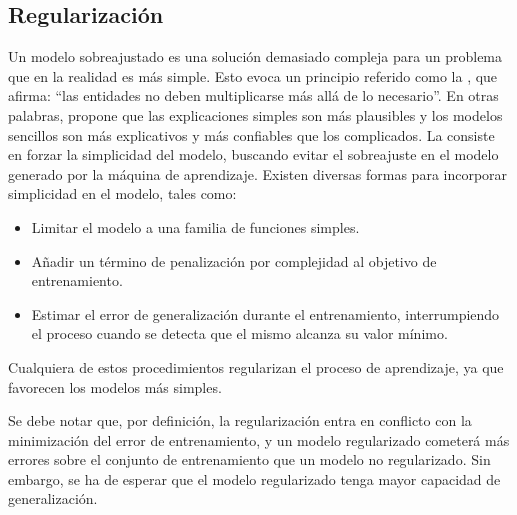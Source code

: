 %
%
\subsection{Regularización}
%
Un modelo sobreajustado es una solución demasiado compleja para un
problema que en la realidad es más simple.
Esto evoca un principio referido como la , que
afirma: ``las entidades no deben multiplicarse más allá
de lo necesario''.
En otras palabras, propone que las explicaciones simples son más
plausibles y los modelos sencillos son más explicativos y más
confiables que los complicados.
La  consiste en forzar la simplicidad del modelo,
buscando evitar el sobreajuste en el modelo generado por la máquina
de aprendizaje.
Existen diversas formas para incorporar simplicidad en el
modelo, tales como:
%
\begin{itemize}
\item Limitar el modelo a una familia de funciones simples.
\item Añadir un término de penalización por complejidad al objetivo
  de entrenamiento.
\item Estimar el error de generalización durante el entrenamiento,
  interrumpiendo el proceso cuando se detecta que el mismo alcanza
  su valor mínimo.
\end{itemize}
%
Cualquiera de estos procedimientos regularizan el proceso de
aprendizaje, ya que favorecen los modelos más simples.

Se debe notar que, por definición, la regularización entra en conflicto con
la minimización del error de entrenamiento, y un modelo regularizado
cometerá más errores sobre el conjunto de entrenamiento que un modelo
no regularizado.
Sin embargo, se ha de esperar que el modelo
regularizado tenga mayor capacidad de generalización.
